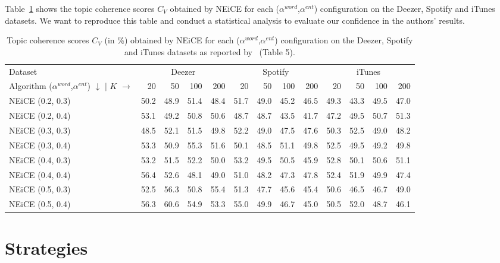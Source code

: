 \documentclass[manuscript]{acmart}
\begin{document}
Table~\ref{tab:authors-results} shows the topic coherence scores $C_V$ obtained by NEiCE for each ($\alpha^{word}$,$\alpha^{ent}$) configuration on the Deezer, Spotify and iTunes datasets. We want to reproduce this table and conduct a statistical analysis to evaluate our confidence in the authors' results.

\begin{table}[h]
  \centering
  \begin{tabular}{lrrrrrrrrrrrr}
      \toprule
      Dataset & \multicolumn{4}{c}{Deezer} & \multicolumn{4}{c}{Spotify} & \multicolumn{4}{c}{iTunes} \\
      Algorithm ($\alpha^{word}$,$\alpha^{ent}$) $\downarrow$ $\mid$ $K$ $\rightarrow$ & 20 & 50 & 100 & 200 & 20 & 50 & 100 & 200 & 20 & 50 & 100 & 200 \\
      \midrule
      NEiCE (0.2, 0.3) & 50.2 & 48.9 & 51.4 & 48.4 & 51.7 & 49.0 & 45.2 & 46.5 & 49.3 & 43.3 & 49.5 & 47.0 \\
      NEiCE (0.2, 0.4) & 53.1 & 49.2 & 50.8 & 50.6 & 48.7 & 48.7 & 43.5 & 41.7 & 47.2 & 49.5 & 50.7 & 51.3 \\
      NEiCE (0.3, 0.3) & 48.5 & 52.1 & 51.5 & 49.8 & 52.2 & 49.0 & 47.5 & 47.6 & 50.3 & 52.5 & 49.0 & 48.2 \\
      NEiCE (0.3, 0.4) & 53.3 & 50.9 & 55.3 & 51.6 & 50.1 & 48.5 & 51.1 & 49.8 & 52.5 & 49.5 & 49.2 & 49.8 \\
      NEiCE (0.4, 0.3) & 53.2 & 51.5 & 52.2 & 50.0 & 53.2 & 49.5 & 50.5 & 45.9 & 52.8 & 50.1 & 50.6 & 51.1 \\
      NEiCE (0.4, 0.4) & 56.4 & 52.6 & 48.1 & 49.0 & 51.0 & 48.2 & 47.3 & 47.8 & 52.4 & 51.9 & 49.9 & 47.4 \\
      NEiCE (0.5, 0.3) & 52.5 & 56.3 & 50.8 & 55.4 & 51.3 & 47.7 & 45.6 & 45.4 & 50.6 & 46.5 & 46.7 & 49.0 \\
      NEiCE (0.5, 0.4) & 56.3 & 60.6 & 54.9 & 53.3 & 55.0 & 49.9 & 46.7 & 45.0 & 50.5 & 52.0 & 48.7 & 46.1 \\
      \bottomrule
  \end{tabular}
  \caption{Topic coherence scores $C_V$ (in \%) obtained by NEiCE for each ($\alpha^{word}$,$\alpha^{ent}$) configuration on the Deezer, Spotify and iTunes datasets as reported by~\citet{valero2022topic} (Table 5).}
  \label{tab:authors-results}
\end{table}

\section{Strategies}
\end{document}
